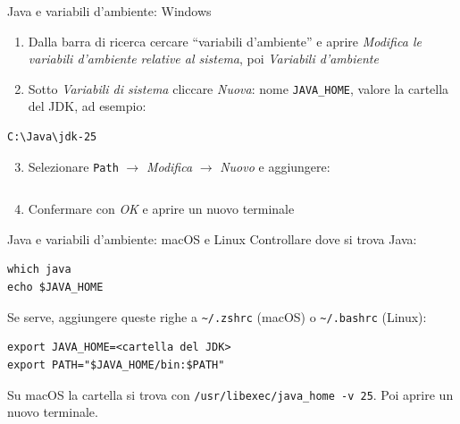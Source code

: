 \documentclass[aspectratio=169,10pt,t]{beamer}
\begin{document}
\begin{frame}[fragile]{Java e variabili d'ambiente: Windows}
  \begin{enumerate}
    \item Dalla barra di ricerca cercare ``variabili d'ambiente'' e aprire \emph{Modifica le variabili d'ambiente relative al sistema}, poi \emph{Variabili d'ambiente}
    \item Sotto \emph{Variabili di sistema} cliccare \emph{Nuova}: nome \texttt{JAVA\_HOME}, valore la cartella del JDK, ad esempio:
  \end{enumerate}
\begin{lstlisting}[language={},numbers=none]
C:\Java\jdk-25
\end{lstlisting}
  \begin{enumerate}\setcounter{enumi}{2}
    \item Selezionare \texttt{Path} $\rightarrow$ \emph{Modifica} $\rightarrow$ \emph{Nuovo} e aggiungere:
  \end{enumerate}
\begin{lstlisting}[language={},numbers=none]
%JAVA_HOME%\bin
\end{lstlisting}
  \begin{enumerate}\setcounter{enumi}{3}
    \item Confermare con \emph{OK} e aprire un nuovo terminale
  \end{enumerate}
\end{frame}

\begin{frame}[fragile]{Java e variabili d'ambiente: macOS e Linux}
  Controllare dove si trova Java:
\begin{lstlisting}[language={},numbers=none]
which java
echo $JAVA_HOME
\end{lstlisting}
  Se serve, aggiungere queste righe a \texttt{\textasciitilde/.zshrc} (macOS) o \texttt{\textasciitilde/.bashrc} (Linux):
\begin{lstlisting}[language={},numbers=none]
export JAVA_HOME=<cartella del JDK>
export PATH="$JAVA_HOME/bin:$PATH"
\end{lstlisting}
  Su macOS la cartella si trova con \texttt{/usr/libexec/java\_home -v 25}. Poi aprire un nuovo terminale.
\end{frame}
\end{document}
